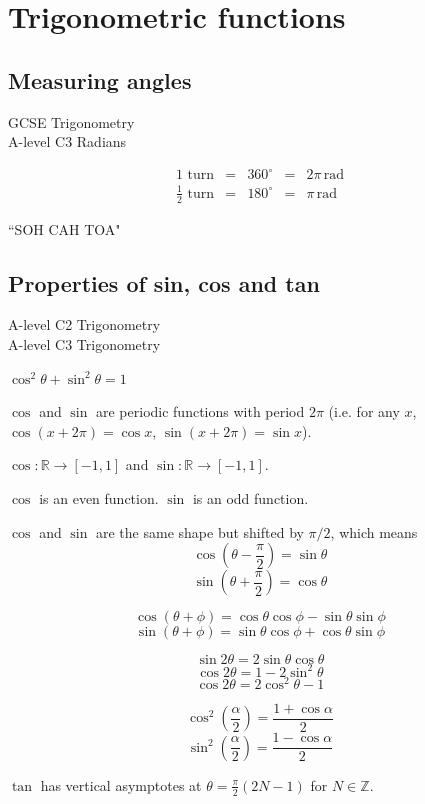 \documentclass[11pt,a4paper,oneside]{book}
\begin{document}
\section{Trigonometric functions}
\subsection{Measuring angles}
\begin{gce}
GCSE Trigonometry\\
A-level C3 Radians
\end{gce}
\begin{in_a_box}
$$\begin{array}{rcccl}
1\text{ turn}&=&360^{\circ}&=&2\pi\,\mbox{rad}\\
\frac{1}{2}\text{ turn}&=&180^{\circ}&=&\pi\,\mbox{rad}
\end{array}$$
\end{in_a_box}
``SOH CAH TOA"

\subsection{Properties of sin, cos and tan}
\begin{gce}
A-level C2 Trigonometry\\
A-level C3 Trigonometry
\end{gce}
$\cos^2\theta+\sin^2\theta=1$

$\cos$ and $\sin$ are periodic functions with period $2\pi$ (i.e. for any $x$, $\cos(x+2\pi)=\cos x$, $\sin(x+2\pi)=\sin x$).

$\cos : \mathbb{R}\to[-1,1]$ and $\sin : \mathbb{R}\to[-1,1]$.

$\cos$ is an even function. $\sin$ is an odd function.

$\cos$ and $\sin$ are the same shape but shifted by $\pi/2$, which means
$$\cos\left(\theta-\frac{\pi}{2}\right)=\sin\theta$$
$$\sin\left(\theta+\frac{\pi}{2}\right)=\cos\theta$$

$$\cos(\theta+\phi)=\cos\theta\cos\phi-\sin\theta\sin\phi$$
$$\sin(\theta+\phi)=\sin\theta\cos\phi+\cos\theta\sin\phi$$

$$\sin2\theta = 2\sin\theta\cos\theta$$
$$\cos2\theta = 1-2\sin^2\theta$$
$$\cos2\theta = 2\cos^2\theta-1$$

$$\cos^2\left(\frac{\alpha}{2}\right)=\frac{1+\cos\alpha}{2}$$
$$\sin^2\left(\frac{\alpha}{2}\right)=\frac{1-\cos\alpha}{2}$$

$\tan$ has vertical asymptotes at $\theta=\frac{\pi}{2}\left(2N-1\right)$ for $N\in\mathbb{Z}$.
\end{document}
